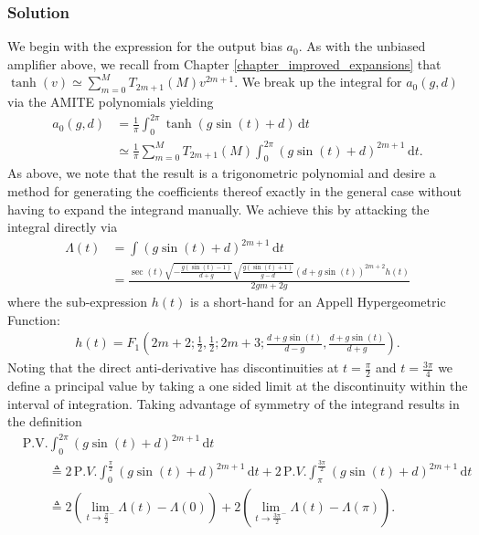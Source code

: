 \subsubsection{Solution}
We begin with the expression for the output bias $a_0$.
As with the unbiased amplifier above, we recall from Chapter
\ref{chapter_improved_expansions} that
$\tanh(v) \simeq \sum_{m=0}^{M} T_{2m+1}(M) v^{2m+1}$.
We break up the integral for $a_0(g, d)$ via the AMITE polynomials yielding
\begin{align}
	a_0(g, d) &= \frac{1}{\pi}\int_{0}^{2\pi} \! \tanh(g \sin(t) + d) \, \mathrm{d}t \\
	&\simeq \frac{1}{\pi} \sum_{m=0}^{M} T_{2m+1}(M)
	\int_{0}^{2\pi} (g \sin(t) + d)^{2m+1} \, \mathrm{d}t.
	\label{eq_nl_gain_integral_a0}
\end{align}
As above, we note that the result is a trigonometric polynomial and desire a method
for generating the coefficients thereof exactly in the general case
without having to expand the integrand manually.  We achieve this by
attacking the integral directly via
\begin{align}
	\Lambda(t) &= \int (g \sin(t) + d)^{2m+1} \, \mathrm{d}t \\
	&=
	\frac{\sec (t) \sqrt{-\frac{g (\sin (t)-1)}{d+g}} \sqrt{\frac{g (\sin (t)+1)}{g-d}} (d+g \sin (t))^{2 m+2} h(t)}{2 g m+2 g}
\end{align}
where the sub-expression $h(t)$ is a short-hand for an Appell Hypergeometric Function:
\begin{align}
h(t) = F_1\left(2 m+2;\frac{1}{2},\frac{1}{2};2 m+3;\frac{d+g \sin (t)}{d-g},\frac{d+g \sin (t)}{d+g}\right).
\end{align}
Noting that the direct anti-derivative has discontinuities at
$t = \frac{\pi}{2}$ and $t = \frac{3\pi}{4}$ we define a
principal value by taking a one sided limit at the discontinuity
within the interval of integration.  Taking advantage of symmetry of the
integrand results in the definition
\begin{align}
	&\mathrm{P.V.} \int_0^{2\pi} \! (g \sin(t) + d)^{2m+1} \, \mathrm{d}t \nonumber \\
	&\quad\quad \triangleq 2 \, \mathrm P.V. \int_0^{\frac{\pi}{2}} (g \sin(t) + d)^{2m+1} \, \mathrm{d}t
	    + 2 \, \mathrm P.V. \int_{\pi}^{\frac{3\pi}{2}} (g \sin(t) + d)^{2m+1} \, \mathrm{d}t \\
	&\quad\quad \triangleq 2\left(\lim_{t\to{\frac{\pi}{2}}^{-}} \Lambda(t) - \Lambda(0)\right)
	    + 2\left(\lim_{t\to{\frac{3\pi}{2}}^{-}} \Lambda(t) - \Lambda(\pi)\right).
\end{align}
